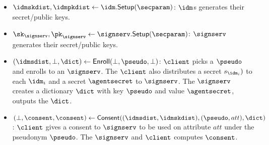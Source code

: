 \begin{itemize}
    \item  $\idmskdist, \idmpkdist \gets \idm.\mathsf{Setup(\secparam)}$: $\idm$s generates their secret/public keys.
    \item $\sk_\signserv, \pk_\signserv \gets \signserv.\mathsf{Setup}(\secparam)$:  $\signserv$ generates their secret/public keys.

    \item $(\idmsdist, \bot, \dict) \gets \mathsf{Enroll}(\bot, \pseudo, \bot)$: $\client$ picks a $\pseudo$ and enrolls to an $\signserv$. The $\client$ also distributes a secret $s_{\idm_i})$ to each $\idm_i$ and a secret $\agentsecret$ to $\signserv$. The $\signserv$ creates a dictionary $\dict$ with key $\pseudo$ and value $\agentsecret$, outputs the $\dict$.

    \item $(\bot, \consent, \consent) \gets \mathsf{Consent}((\idmsdist, \idmskdist), (\pseudo, att), \dict)$: $\client$ gives a consent to $\signserv$ to be used on attribute $att$ under the pseudonym $\pseudo$. The $\signserv$ and $\client$ computes $\consent$.
\end{itemize}

